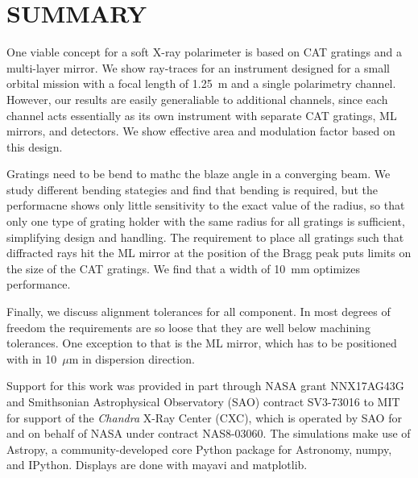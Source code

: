 \documentclass[]{spie}  %
\begin{document}
\section{SUMMARY}
One viable concept for a soft X-ray polarimeter is based on CAT gratings and a multi-layer mirror. We show ray-traces for an instrument designed for a small orbital mission with a focal length of 1.25~m and a single polarimetry channel. However, our results are easily generaliable to additional channels, since each channel acts essentially as its own instrument with separate CAT gratings, ML mirrors, and detectors. We show effective area and modulation factor based on this design.

Gratings need to be bend to mathc the blaze angle in a converging beam. We study different bending stategies and find that bending is required, but the performacne shows only little sensitivity to the exact value of the radius, so that only one type of grating holder with the same radius for all gratings is sufficient, simplifying design and handling. The requirement to place all gratings such that diffracted rays hit the ML mirror at the position of the Bragg peak puts limits on the size of the CAT gratings. We find that a width of 10~mm optimizes performance. 

Finally, we discuss alignment tolerances for all component. In most degrees of freedom the requirements are so loose that they are well below machining tolerances. One exception to that is the ML mirror, which has to be positioned with in 10~$\mu$m in dispersion direction.

\acknowledgments %
Support for this work was provided in part through NASA grant NNX17AG43G and Smithsonian Astrophysical Observatory (SAO)
contract SV3-73016 to MIT for support of the {\em Chandra} X-Ray Center (CXC),
which is operated by SAO for and on behalf of NASA under contract NAS8-03060.
The simulations make use of Astropy, a community-developed core Python package
for Astronomy\cite{astropy1,astropy2}, numpy\cite{numpy}, and
IPython\cite{IPython}. Displays are done with mayavi\cite{mayavi} and matplotlib\cite{matplotlib}.


\end{document}
